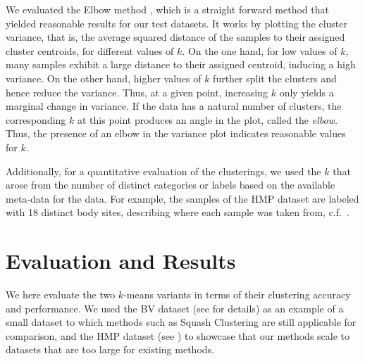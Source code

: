 We evaluated the Elbow method \cite{Thorndike1953},
which is a straight forward method that yielded reasonable results for our test datasets.
It works by plotting the cluster variance,
that is, the average squared distance of the samples to their assigned cluster centroids,
for different values of $k$.
On the one hand, for low values of $k$, many samples exhibit a large distance to their assigned centroid,
inducing a high variance.
On the other hand, higher values of $k$ further split the clusters and hence reduce the variance.
Thus, at a given point, increasing $k$ only yields a marginal change in variance.
If the data has a natural number of clusters, the corresponding $k$ at this point produces an angle in the plot,
called the \emph{elbow}.
Thus, the presence of an elbow in the variance plot indicates reasonable values for $k$.

Additionally, for a quantitative evaluation of the clusterings,
we used the $k$ that arose from the number of distinct categories or labels based on the available meta-data for the data.
For example, the samples of the \ac{HMP} dataset are labeled with \num{18} distinct body sites,
describing where each sample was taken from, c.f.~.


\section{Evaluation and Results}
\label{ch:Clustering:sec:Results}

We here evaluate the two $k$-means variants in terms of their clustering accuracy and performance.
We used the \acf{BV} dataset (see  for details)
as an example of a small dataset to which methods such as Squash Clustering \cite{Matsen2011a}
are still applicable for comparison,
and the \acf{HMP} dataset (see )
to showcase that our methods scale to datasets that are too large for existing methods.

